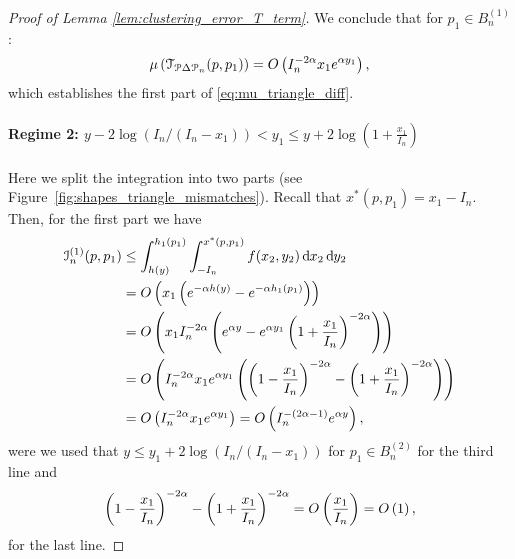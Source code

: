 \begin{proof}[Proof of Lemma \ref{lem:clustering_error_T_term}]
We conclude that for $p_1 \in B_n^{(1)}$:
\[
	\mu\left(\mathcal{T}_{{\mathcal P} \Delta {\mathcal P}_n}(p,p_1)\right) = O\left(I_n^{-2\alpha} x_1 e^{\alpha y_1}\right),
\]
which establishes the first part of \eqref{eq:mu_triangle_diff}.

\paragraph{Regime 2: $y - 2\log(I_n/(I_n-x_1)) < y_1 \le y + 2 \log\left(1 + \frac{x_1}{I_n}\right)$}

Here we split the integration into two parts (see Figure~\ref{fig:shapes_triangle_mismatches}). Recall that $x^\ast(p,p_1) = x_1 - I_n$. Then, for the first part we have
\begin{align*}
	\mathcal{I}_n^{(1)}(p,p_1) &\le \int_{h(y)}^{h_1(p_1)} \int_{-I_n}^{x^\ast(p,p_1)} f(x_2, y_2) 
		\operatorname{\mathrm{d}\hspace{-2pt}} x_2 \operatorname{\mathrm{d}\hspace{-2pt}} y_2\\
	&= O\left(x_1 \left(e^{-\alpha h(y)} - e^{-\alpha h_1(p_1)}\right)\right)\\
	&= O\left(x_1 I_n^{-2\alpha}\left(e^{\alpha y} - e^{\alpha y_1}\left(1 + \frac{x_1}{I_n}\right)^{-2\alpha}\right)\right)\\
	&= O\left(I_n^{-2\alpha} x_1 e^{\alpha y_1}\left(\left(1 - \frac{x_1}{I_n}\right)^{-2\alpha} 
		- \left(1 + \frac{x_1}{I_n}\right)^{-2\alpha}\right)\right)\\
	&= O\left(I_n^{-2\alpha} x_1 e^{\alpha y_1}\right) = O\left(I_n^{-(2\alpha - 1)} e^{\alpha y}\right), 
\end{align*}
were we used that $y \le y_1 + 2\log(I_n/(I_n-x_1))$ for $p_1 \in B_n^{(2)}$ for the third line and 
\[
	\left(1 - \frac{x_1}{I_n}\right)^{-2\alpha} - \left(1 + \frac{x_1}{I_n}\right)^{-2\alpha}
	= O\left(\frac{x_1}{I_n}\right) = O\left(1\right),
\]
for the last line.


\end{proof}
